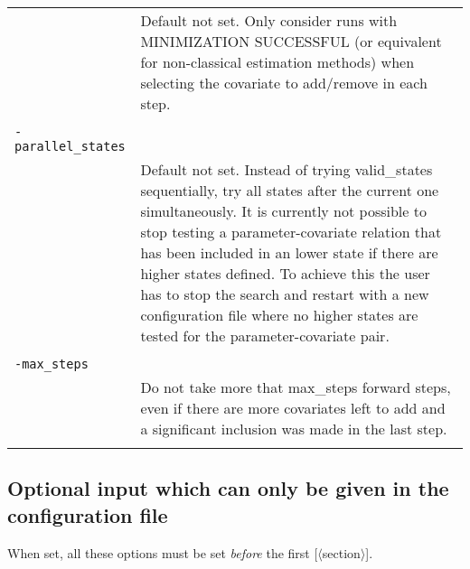 \documentclass[a4paper,12pt]{article}
\begin{document}
\begin{longtable}{p{1in}p{4in}}
\nopagebreak
 & Default not set. Only consider runs with MINIMIZATION SUCCESSFUL (or equivalent for non-classical estimation methods) when selecting the covariate to add/remove in each step. \\
\\
\verb|-parallel_states| & \\
\nopagebreak
 & Default not set. Instead of trying valid\_states sequentially, try all states after the current one simultaneously. It is currently not possible to stop testing a parameter-covariate relation that has been included in an lower state if there are higher states defined. To achieve this the user has to stop the search and restart with a new configuration file where no higher states are tested for the parameter-covariate pair. \\
\\
\verb|-max_steps| & \\
\nopagebreak
 & Do not take more that max\_steps forward steps, even if there are more covariates left to add and a significant inclusion was made in the last step. \\
\\
\end{longtable}


\subsection{Optional input which can only be given in the configuration file}
When set, all these options must be set \emph{before} the first [$\langle$section$\rangle$].
\end{document}
